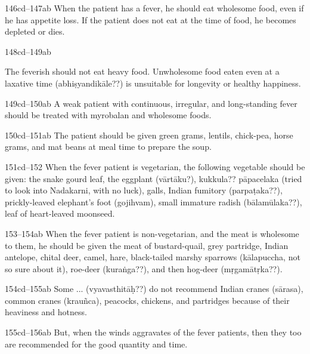 \begin{translation}
    \item[146cd--147ab]  When the patient has a fever, he should eat 
wholesome food,
    even if he has appetite loss. If the patient does not eat at the time of
    food, he becomes depleted or dies.
    
    
    \item[148cd--149ab]  
    
    The feverish should not eat heavy food.  Unwholesome food eaten even at
a laxative time (abhiṣyandikāle??) is unsuitable for longevity or
healthy happiness.
    
    \item[149cd--150ab]  A weak patient with continuous, irregular, and
    long-standing fever should be treated with myrobalan and wholesome
    foods.
    
    \item[150cd--151ab]  The patient should be given green grams, lentils,
    chick-pea, horse grams, and mat beans at meal time to prepare the soup.
    
    
    \item[151cd--152]  When the fever patient is vegetarian, the following 
vegetable
    should be given: the snake gourd leaf, the eggplant (vārtāku?),
    kukkula?? pāpacelaka (tried to look into Nadakarni, with no luck),
    galls, Indian fumitory (parpaṭaka??), prickly-leaved elephant's foot
    (gojihvam), small immature radish (bālamūlaka??), leaf of heart-leaved
    moonseed.
    
    \item[153--154ab]  When the fever patient is non-vegetarian, and the meat is
    wholesome to them, he should be given the meat of bustard-quail, grey
    partridge, Indian antelope, chital deer, camel, hare, black-tailed
    marshy sparrows (kālapuccha, not so sure about it), roe-deer
    (kuraṅga??), and then hog-deer (mṛgamātṛka??).
    
    \item[154cd--155ab]  Some ... (vyavasthitāḥ??) do not recommend Indian 
cranes
    (sārasa), common cranes (krauñca), peacocks, chickens, and partridges
    because of their heaviness and hotness.
    
    
    \item[155cd--156ab]  But, when the winds aggravates of the fever patients, 
then
    they too are recommended for the good quantity and time.
    

\end{translation}

